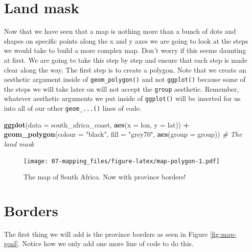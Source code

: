 \documentclass[]{book}
\newenvironment{Shaded}{\begin{snugshade}}{\end{snugshade}}
\newcommand{\KeywordTok}[1]{\textcolor[rgb]{0.13,0.29,0.53}{\textbf{#1}}}
\newcommand{\DataTypeTok}[1]{\textcolor[rgb]{0.13,0.29,0.53}{#1}}
\newcommand{\StringTok}[1]{\textcolor[rgb]{0.31,0.60,0.02}{#1}}
\newcommand{\CommentTok}[1]{\textcolor[rgb]{0.56,0.35,0.01}{\textit{#1}}}
\newcommand{\OperatorTok}[1]{\textcolor[rgb]{0.81,0.36,0.00}{\textbf{#1}}}
\newcommand{\NormalTok}[1]{#1}
\theoremstyle{definition}
\theoremstyle{definition}
\theoremstyle{definition}
\theoremstyle{remark}
\begin{document}
\section{Land mask}\label{land-mask}

Now that we have seen that a map is nothing more than a bunch of dots
and shapes on specific points along the x and y axes we are going to
look at the steps we would take to build a more complex map. Don't worry
if this seems daunting at first. We are going to take this step by step
and ensure that each step is made clear along the way. The first step is
to create a polygon. Note that we create an aesthetic argument inside of
\texttt{geom\_polygon()} and not \texttt{ggplot()} because some of the
steps we will take later on will not accept the \texttt{group}
aesthetic. Remember, whatever aesthetic arguments we put inside of
\texttt{ggplot()} will be inserted for us into all of our other
\texttt{geom\_...()} lines of code.

\begin{Shaded}
\begin{Highlighting}[]
\KeywordTok{ggplot}\NormalTok{(}\DataTypeTok{data =}\NormalTok{ south_africa_coast, }\KeywordTok{aes}\NormalTok{(}\DataTypeTok{x =}\NormalTok{ lon, }\DataTypeTok{y =}\NormalTok{ lat)) }\OperatorTok{+}
\StringTok{  }\KeywordTok{geom_polygon}\NormalTok{(}\DataTypeTok{colour =} \StringTok{"black"}\NormalTok{, }\DataTypeTok{fill =} \StringTok{"grey70"}\NormalTok{, }\KeywordTok{aes}\NormalTok{(}\DataTypeTok{group =}\NormalTok{ group)) }\CommentTok{# The land mask}
\end{Highlighting}
\end{Shaded}

\begin{figure}
\centering
\texttt{[image: 07-mapping\_files/figure-latex/map-polygon-1.pdf]}
\caption{\label{fig:map-polygon}The map of South Africa. Now with province
borders!}
\end{figure}

\section{Borders}\label{borders}

The first thing we will add is the province borders as seen in Figure
\ref{fig:map-goal}. Notice how we only add one more line of code to do
this.
\end{document}
